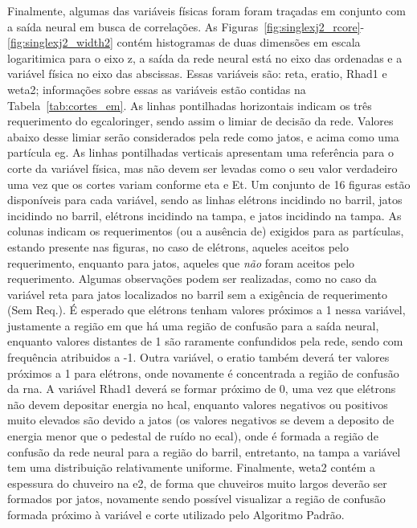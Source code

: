Finalmente, algumas das variáveis físicas foram foram traçadas em conjunto com
a saída neural em busca de correlações. As
Figuras~\ref{fig:singlexj2_rcore}-\ref{fig:singlexj2_width2} contém histogramas
de duas dimensões em escala logaritimica para o eixo z, 
a saída da rede neural está no eixo das ordenadas e a
variável física no eixo das abscissas. Essas variáveis são: \gls{reta},
\gls{eratio}, \gls{Rhad1} e \gls{weta2}; informações sobre essas as variáveis estão
contidas na Tabela~\ref{tab:cortes_em}. As linhas pontilhadas horizontais
indicam os três requerimento do \gls{egcaloringer}, sendo assim o limiar de
decisão da rede. Valores abaixo desse limiar serão considerados pela rede como
jatos, e acima como uma partícula \gls{eg}. As linhas pontilhadas verticais
apresentam uma referência para o corte da variável física, mas não devem ser
levadas como o seu valor verdadeiro uma vez que os cortes variam conforme
\gls{eta} e \gls{Et}. Um conjunto de 16 figuras estão
disponíveis para cada variável, sendo as linhas elétrons 
incidindo no barril, jatos incidindo no barril, elétrons incidindo na tampa, e
jatos incidindo na tampa. As colunas indicam os requerimentos (ou a ausência de) exigidos para as
partículas, estando presente nas figuras, no caso de elétrons, aqueles aceitos pelo 
requerimento, enquanto para jatos, aqueles que \emph{não} foram aceitos pelo
requerimento. Algumas observações podem ser realizadas, como no caso da variável
\gls{reta} para jatos localizados no
barril sem a exigência de requerimento (Sem Req.). É esperado que elétrons
tenham valores próximos a 1 nessa variável, justamente a região em que há uma
região de confusão para a saída neural, enquanto valores distantes de 1 são
raramente confundidos pela rede, sendo com frequência atribuidos a -1. Outra
variável, o \gls{eratio} também deverá ter valores próximos a 1 para elétrons,
onde novamente é concentrada a região de confusão da \gls{rna}. A variável
\gls{Rhad1} deverá se formar próximo de 0, uma vez que elétrons não devem
depositar energia no \gls{hcal}, enquanto valores negativos ou positivos muito
elevados são devido a jatos (os valores negativos se devem a deposito de energia
menor que o pedestal de ruído no \gls{ecal}), onde é formada a região de
confusão da rede neural para a região do barril, entretanto, na tampa a variável
tem uma distribuição relativamente uniforme. Finalmente, \gls{weta2} contém a
espessura do chuveiro na \gls{e2}, de forma que chuveiros muito largos deverão
ser formados por jatos, novamente sendo possível visualizar a região de confusão
formada próximo à variável e corte utilizado pelo Algoritmo Padrão.



